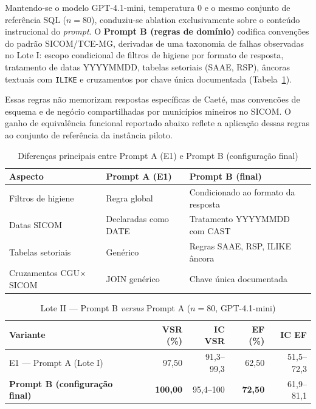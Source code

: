 Mantendo-se o modelo GPT-4.1-mini, temperatura 0 e o mesmo conjunto de referência SQL ($n=80$), conduziu-se ablation exclusivamente sobre o conteúdo instrucional do \textit{prompt}. O \textbf{Prompt B (regras de domínio)} codifica convenções do padrão SICOM/TCE-MG, derivadas de uma taxonomia de falhas observadas no Lote I: escopo condicional de filtros de higiene por formato de resposta, tratamento de datas YYYYMMDD, tabelas setoriais (SAAE, RSP), âncoras textuais com \texttt{ILIKE} e cruzamentos por chave única documentada (Tabela~\ref{tab:prompt_diff}).

Essas regras não memorizam respostas específicas de Caeté, mas convencões de esquema e de negócio compartilhadas por municípios mineiros no SICOM. O ganho de equivalência funcional reportado abaixo reflete a aplicação dessas regras ao conjunto de referência da instância piloto.

\begin{table}[htbp]
\centering
\caption{Diferenças principais entre Prompt A (E1) e Prompt B (configuração final)}
\label{tab:prompt_diff}
\small
\begin{tabular}{p{4cm}p{4.5cm}p{4.5cm}}
\toprule
\textbf{Aspecto} & \textbf{Prompt A (E1)} & \textbf{Prompt B (final)} \\
\midrule
Filtros de higiene & Regra global & Condicionado ao formato da resposta \\
Datas SICOM & Declaradas como DATE & Tratamento YYYYMMDD com CAST \\
Tabelas setoriais & Genérico & Regras SAAE, RSP, ILIKE âncora \\
Cruzamentos CGU$\times$SICOM & JOIN genérico & Chave única documentada \\
\bottomrule
\end{tabular}
\end{table}

\begin{table}[htbp]
\centering
\caption{Lote II --- Prompt B \textit{versus} Prompt A ($n=80$, GPT-4.1-mini)}
\label{tab:prompt_v2}
\small
\begin{tabular}{lrrrr}
\toprule
\textbf{Variante} & \textbf{VSR (\%)} & \textbf{IC VSR} & \textbf{EF (\%)} & \textbf{IC EF} \\
\midrule
E1 --- Prompt A (Lote I) & 97,50 & 91,3--99,3 & 62,50 & 51,5--72,3 \\
\textbf{Prompt B (configuração final)} & \textbf{100,00} & 95,4--100 & \textbf{72,50} & 61,9--81,1 \\
\bottomrule
\end{tabular}
\end{table}


